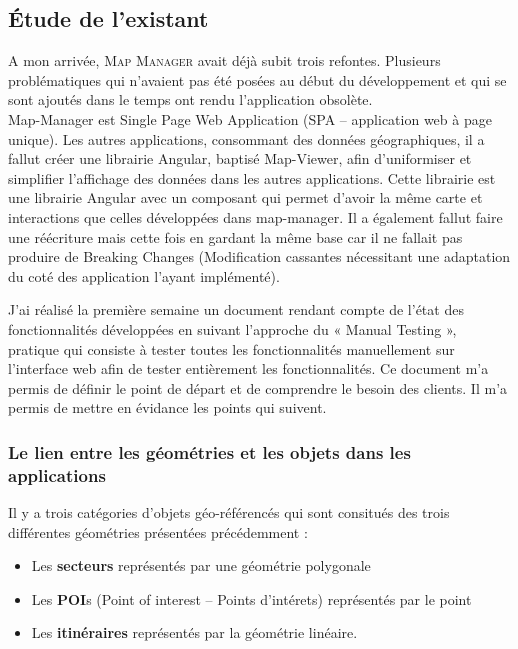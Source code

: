 \documentclass{rapportUHA40}
\begin{document}
\subsection{Étude de l'existant}
A mon arrivée, \textsc{Map Manager} avait déjà subit trois refontes. Plusieurs
problématiques qui n'avaient pas été posées au début du développement et qui se
sont ajoutés dans le temps ont rendu l'application obsolète. \\

Map-Manager est Single Page Web Application (SPA – application web à page
unique). Les autres applications, consommant des données géographiques, il a
fallut créer une librairie Angular, baptisé Map-Viewer, afin d'uniformiser et
simplifier l'affichage des données dans les autres applications. Cette
librairie est une librairie Angular avec un composant qui permet d'avoir la
même carte et interactions que celles développées dans map-manager. Il a
également fallut faire une réécriture mais cette fois en gardant la même base
car il ne fallait pas produire de Breaking Changes (Modification cassantes
nécessitant une adaptation du coté des application l'ayant implémenté).

J’ai réalisé la première semaine un document rendant compte de l’état des
fonctionnalités développées en suivant l’approche du « Manual Testing »,
pratique qui consiste à tester toutes les fonctionnalités manuellement sur
l’interface web afin de tester entièrement les fonctionnalités. Ce document m’a
permis de définir le point de départ et de comprendre le besoin des clients. Il
m'a permis de mettre en évidance les points qui suivent.

\subsubsection{Le lien entre les géométries et les objets dans les applications}
Il y a trois catégories d'objets géo-référencés qui sont consitués des trois
différentes géométries présentées précédemment :
\begin{itemize}
  \item Les \textbf{secteurs} représentés par une géométrie polygonale
  \item Les \textbf{POI}s (Point of interest – Points d'intérets) représentés par le
        point
  \item Les \textbf{itinéraires} représentés par la géométrie linéaire. \\
\end{itemize}
\end{document}
